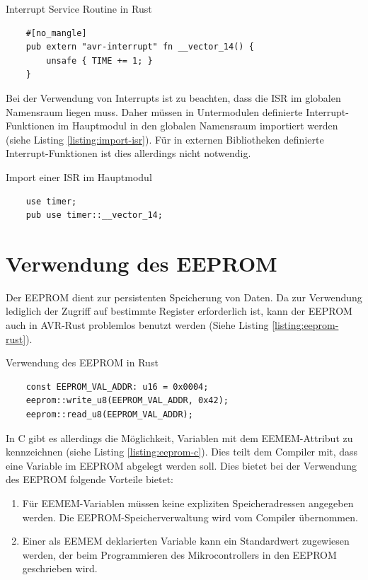 \documentclass
[ 12pt,
  parskip=half %
]{scrreprt}
\newenvironment{mylisting}[1][H]
{\captionsetup{aboveskip=-0.2\normalbaselineskip}\begin{listing}[#1]}
{\end{listing}}
\begin{document}
\begin{mylisting}
	\caption{Interrupt Service Routine in Rust}
	\label{listing:isr-example}
	\begin{verbatim}
	#[no_mangle]
	pub extern "avr-interrupt" fn __vector_14() {
		unsafe { TIME += 1; } 
	}
	\end{verbatim}
\end{mylisting} 
	
Bei der Verwendung von Interrupts ist zu beachten, dass die ISR im globalen Namensraum liegen muss. Daher müssen in Untermodulen definierte Interrupt-Funktionen im Hauptmodul in den globalen Namensraum importiert werden (siehe Listing \ref{listing:import-isr}). Für in externen Bibliotheken definierte Interrupt-Funktionen ist dies allerdings nicht notwendig.

\begin{mylisting}
	\caption{Import einer ISR im Hauptmodul}
	\label{listing:import-isr}
	\begin{verbatim}
	use timer;
	pub use timer::__vector_14;
	\end{verbatim}
\end{mylisting} 

\section{Verwendung des EEPROM}

Der EEPROM dient zur persistenten Speicherung von Daten. Da zur Verwendung lediglich der Zugriff auf bestimmte Register erforderlich ist, kann der EEPROM auch in AVR-Rust problemlos benutzt werden (Siehe Listing \ref{listing:eeprom-rust}).

\begin{mylisting}
	\caption{Verwendung des EEPROM in Rust}
	\label{listing:eeprom-rust}
	\begin{verbatim}
	const EEPROM_VAL_ADDR: u16 = 0x0004;
	eeprom::write_u8(EEPROM_VAL_ADDR, 0x42);
	eeprom::read_u8(EEPROM_VAL_ADDR);
	\end{verbatim}
\end{mylisting} 

In C gibt es allerdings die Möglichkeit, Variablen mit dem EEMEM-Attribut zu kennzeichnen (siehe Listing \ref{listing:eeprom-c}). Dies teilt dem Compiler mit, dass eine Variable im EEPROM abgelegt werden soll. Dies bietet bei der Verwendung des EEPROM folgende Vorteile bietet:
\begin{enumerate}
	\item Für EEMEM-Variablen müssen keine expliziten Speicheradressen angegeben werden. Die EEPROM-Speicherverwaltung wird vom Compiler übernommen.
	\item Einer als EEMEM deklarierten Variable kann ein Standardwert zugewiesen werden, der beim Programmieren des Mikrocontrollers in den EEPROM geschrieben wird.
\end{enumerate}
\end{document}
